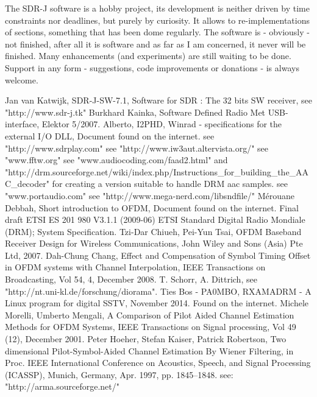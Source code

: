 \documentclass[11pt]{article}
\begin{document}
The SDR-J software is a hobby project, its development is neither
driven by time constraints nor deadlines, but purely by curiosity.
It allows to re-implementations of sections, something
that has been dome regularly.
The software is - obviously - not finished, after all
it is software and as far as I am concerned, it never will be finished.
Many enhancements (and experiments) are still waiting to be done.
Support in any form - suggestions, code improvements or donations - is
always welcome.
\begin{thebibliography}{9}
%
Jan van Katwijk,
SDR-J-SW-7.1,
Software for SDR : The 32 bits SW receiver,
see "http://www.sdr-j.tk"
%
Burkhard Kainka,
Software Defined Radio
Met USB-interface,
Elektor 5/2007.
%
Alberto, I2PHD,
Winrad - specifications for the external I/O DLL,
Document found on the internet.
%
see "http://www.sdrplay.com"
%
see "http://www.iw3aut.altervista.org/"
%
see "www.fftw.org"
%
see "www.audiocoding.com/faad2.html" and "http://drm.sourceforge.net/wiki/index.php/Instructions\_for\_building\_the\_AAC\_decoder" for creating a version suitable
to handle DRM aac samples.
%
see "www.portaudio.com"
%
see "http://www.mega-nerd.com/libsndfile/"
%
M\'erouane Debbah,
Short introduction to OFDM,
Document found on the internet.
%
Final draft
ETSI ES 201 980 V3.1.1 (2009-06)
ETSI Standard
Digital Radio Mondiale (DRM);
System Specification.
%
Tzi-Dar Chiueh,
Pei-Yun Tsai,
OFDM Baseband Receiver
Design for Wireless
Communications,
John Wiley and Sons (Asia) Pte Ltd, 2007.
%
Dah-Chung Chang,
Effect and Compensation of Symbol Timing Offset in OFDM systems with Channel Interpolation,
IEEE Transactions on Broadcasting, Vol 54, 4, December 2008.
%
T. Schorr, A. Dittrich,
see "http://nt.uni-kl.de/forschung/diorama".
%
Ties Bos - PA0MBO,
RXAMADRM - A Linux program for digital SSTV,
November 2014.
Found on the internet.
%
Michele Morelli, Umberto Mengali,
A Comparison of Pilot Aided Channel Estimation Methods for OFDM Systems,
IEEE Transactions on Signal processing, Vol 49 (12), December 2001.
%
Peter Hoeher, Stefan Kaiser, Patrick Robertson, Two dimensional Pilot-Symbol-Aided Channel Estimation By Wiener Filtering,
in Proc. IEEE International Conference on Acoustics,
Speech, and Signal Processing (ICASSP), Munich, Germany, Apr. 1997, pp. 1845–1848.
%
see: "http://arma.sourceforge.net/"

\end{thebibliography}
\end{document}
